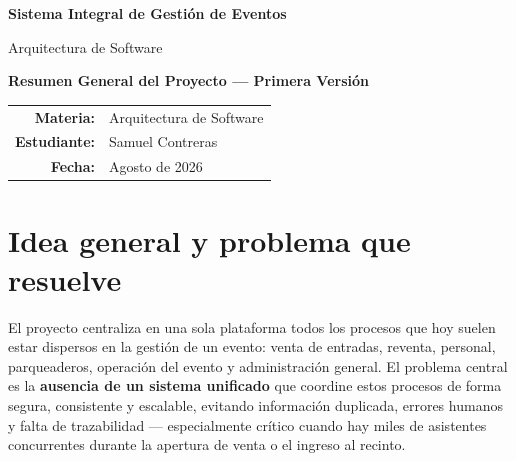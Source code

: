 \documentclass[12pt,a4paper]{article}
\begin{document}
\begin{titlepage}
\centering
\vspace*{2cm}
{\Huge\bfseries Sistema Integral de Gestión de Eventos\par}
\vspace{0.7cm}
{\Large Arquitectura de Software\par}
\vspace{1.2cm}
{\Large\bfseries Resumen General del Proyecto --- Primera Versión\par}
\vspace{2cm}
\vfill
\begin{tabular}{rl}
\textbf{Materia:} & Arquitectura de Software\\
\textbf{Estudiante:} & Samuel Contreras\\
\textbf{Fecha:} & Agosto de 2026
\end{tabular}
\end{titlepage}

\tableofcontents
\newpage

\section{Idea general y problema que resuelve}

El proyecto centraliza en una sola plataforma todos los procesos que hoy suelen estar dispersos
en la gestión de un evento: venta de entradas, reventa, personal, parqueaderos, operación del
evento y administración general. El problema central es la \textbf{ausencia de un sistema
unificado} que coordine estos procesos de forma segura, consistente y escalable, evitando
información duplicada, errores humanos y falta de trazabilidad --- especialmente crítico cuando
hay miles de asistentes concurrentes durante la apertura de venta o el ingreso al recinto.
\end{document}

